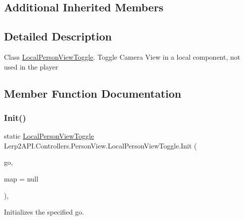 \subsection*{Additional Inherited Members}


\subsection{Detailed Description}
Class \hyperlink{class_lerp2_a_p_i_1_1_controllers_1_1_person_view_1_1_local_person_view_toggle}{Local\+Person\+View\+Toggle}. Toggle Camera View in a local component, not used in the player 



\subsection{Member Function Documentation}
\mbox{\label{class_lerp2_a_p_i_1_1_controllers_1_1_person_view_1_1_local_person_view_toggle_a6517f9b0a7a0c1e0d736ba71c9cf32bc}} 
\subsubsection{\texorpdfstring{Init()}{Init()}}
{\footnotesize\ttfamily static \hyperlink{class_lerp2_a_p_i_1_1_controllers_1_1_person_view_1_1_local_person_view_toggle}{Local\+Person\+View\+Toggle} Lerp2\+A\+P\+I.\+Controllers.\+Person\+View.\+Local\+Person\+View\+Toggle.\+Init (\begin{DoxyParamCaption}\item[{Game\+Object}]{go,  }\item[{\hyperlink{class_lerp2_a_p_i_1_1_hepers_1_1_unity___extensions_1_1_utils_1_1_key_map}{Key\+Map}}]{map = {\ttfamily null} }\end{DoxyParamCaption})\hspace{0.3cm}{\ttfamily [inline]}, {\ttfamily [static]}}



Initializes the specified go. 


